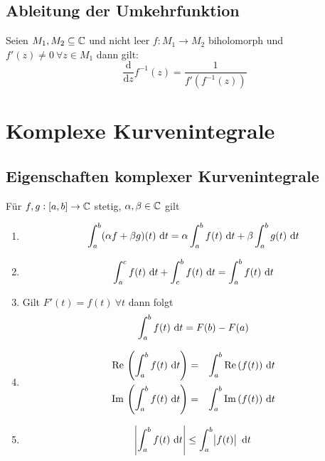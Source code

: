 \subsection{Ableitung der Umkehrfunktion}
Seien $M_1, M_2 \subseteq \mathbb{C}$ und nicht leer $f: M_1 \to M_2$ biholomorph und $f'(z) \neq 0\ \forall z \in M_1$ dann
gilt:
\begin{equation*}
    \frac{\text{d}}{\text{d}z} f^{-1}(z) = \frac{1}{f'(f^{-1}(z))}
\end{equation*}

\section{Komplexe Kurvenintegrale}
\subsection{Eigenschaften komplexer Kurvenintegrale}
Für $f,g: [a,b] \to \mathbb{C}$ stetig, $\alpha,\beta \in \mathbb{C}$ gilt
\begin{enumerate}
    \item
        \begin{equation*}
            \int_a^b (\alpha f + \beta g)(t)\text{ d}t = \alpha \int_a^b f(t) \text{ d}t + \beta \int_a^b g(t) \text{ d}t
        \end{equation*}
    \item
        \begin{equation*}
            \int_a^c f(t) \text{ d}t + \int_c^b f(t) \text{ d}t = \int_a^b f(t) \text{ d}t
        \end{equation*}
    \item
        Gilt $F'(t) = f(t)\ \forall t$ dann folgt
        \begin{equation*}
            \int_a^b f(t) \text{ d}t = F(b) - F(a)
        \end{equation*}
    \item
        \begin{eqnarray*}
            \operatorname{Re}{} \left( \int_a^b f(t) \text{ d}t \right) &=& \int_a^b \operatorname{Re}{} ( f(t)) \text{ d}t \\
            \operatorname{Im}{} \left( \int_a^b f(t) \text{ d}t \right) &=& \int_a^b \operatorname{Im}{} ( f(t)) \text{ d}t
        \end{eqnarray*}
    \item
        \begin{equation*}
            \abs{ \int_a^b f(t) \text{ d}t} \leq \int_a^b \abs{f(t)} \text{ d}t
        \end{equation*}
\end{enumerate}

